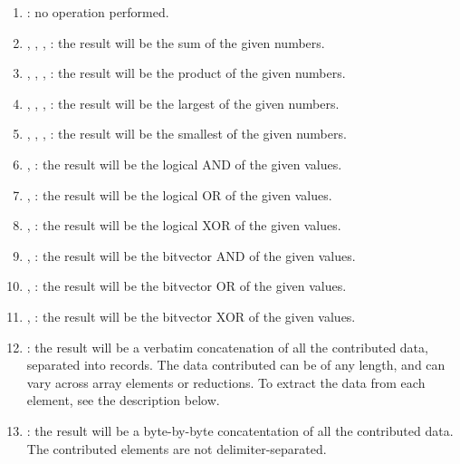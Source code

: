 \begin{enumerate}

\item {} : no operation performed.

\item {}, , ,  : the
result will be the sum of the given numbers.

\item {}, , ,
 : the result will be the product of the given numbers.

\item {}, , ,  : the
result will be the largest of the given numbers.

\item {}, , ,  : the
result will be the smallest of the given numbers.

\item {},  : the result will be the logical AND of the given
values.

\item {},  : the result will be the logical OR of the given
values.

\item {},  : the result will be the logical XOR of the given
values.

\item {},  : the result will be the bitvector AND of the given
values.

\item {},  : the result will be the bitvector OR of the given
values.

\item {},  : the result will be the bitvector XOR of the given
values.

\item {} : the result will be a verbatim concatenation of
all the contributed data, separated into  records.
The data contributed can be of any length, and can vary across array elements
or reductions.  To extract the data from each element, see the description
below.

\item {} : the result will be a byte-by-byte
concatentation of all the contributed data.  The contributed elements
are not delimiter-separated. 

\end{enumerate}

